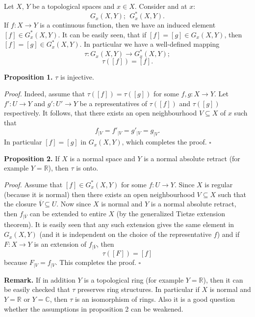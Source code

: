 \documentclass[12pt]{article}
\begin{document}
Let $X$, $Y$ be a topological spaces and $x\in X$. Consider  and  at $x$:
$$G_x(X,Y);\ \ G_x^*(X,Y).$$
If $f:X\to Y$ is a continuous function, then we have an induced element $[f]\in G_x^*(X,Y)$. It can be easily seen, that if $[f]=[g]\in G_x(X,Y)$, then $[f]=[g]\in G_x^*(X,Y)$. In particular we have a well-defined mapping
$$\tau:G_x(X,Y)\to G_x^*(X,Y);$$
$$\tau([f])=[f].$$

\textbf{Proposition 1.} $\tau$ is injective.

\textit{Proof.} Indeed, assume that $\tau([f])=\tau([g])$ for some $f,g:X\to Y$. Let $f':U\to Y$ and $g':U'\to Y$ be a representatives of $\tau([f])$ and $\tau([g])$ respectively. It follows, that there exists an open neighbourhood $V\subseteq X$ of $x$ such that 
$$f_{|V}=f'_{|V}=g'_{|V}=g_{|V}.$$
In particular $[f]=[g]$ in $G_x(X,Y)$, which completes the proof. $\square$

\textbf{Proposition 2.} If $X$ is a normal space and $Y$ is a normal absolute retract (for example $Y=\mathbb{R}$), then $\tau$ is onto.

\textit{Proof.} Assume that $[f]\in G_x^*(X,Y)$ for some $f:U\to Y$. Since $X$ is regular (because it is normal) then there exists an open neighbourhood $V\subseteq X$ such that the closure $\overline{V}\subseteq U$. Now since $X$ is normal and $Y$ is a normal absolute retract, then $f_{|\overline{V}}$ can be extended to entire $X$ (by the generalized Tietze extension theorem). It is easily seen that any such extension gives the same element in $G_x(X,Y)$ (and it is independent on the choice of the representative $f$) and if $F:X\to Y$ is an extension of $f_{|\overline{V}}$, then
$$\tau([F])=[f]$$
because $F_{|V}=f_{|V}$. This completes the proof. $\square$

\textbf{Remark.} If in addition $Y$ is a topological ring (for example $Y=\mathbb{R}$), then it can be easily checked that $\tau$ preserves ring structures. In particular if $X$ is normal and $Y=\mathbb{R}$ or $Y=\mathbb{C}$, then $\tau$ is an isomorphism of rings. Also it is a good question whether the assumptions in proposition 2 can be weakened.
\end{document}
